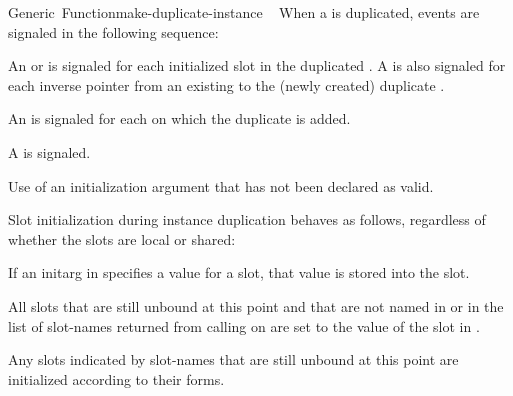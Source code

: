 \documentclass[10pt,twoside,english,pdftex]{article}
\begin{document}
\begin{functiondoc}{Generic~Function}{make-duplicate-instance}{%
     
     
    \mbox{\returns{} }}
\fnevents
{}%
%
%
%
%
%
%
%
%
%
%
%
When a  is duplicated, events are signaled in the
following sequence: 
\begin{tightenumerate}
\item An  or  is
  signaled for each initialized slot in the duplicated
  .  A  is also signaled for
  each inverse pointer from an existing  to the
  (newly created) duplicate .
\item An  is signaled
  for each  on which the duplicate
   is added.
\item A  is signaled.
\end{tightenumerate}

\fnerrors
Use of an initialization argument that has not been declared as valid.

%
%
%
\fndescription 
%
Slot initialization during instance duplication behaves as follows, regardless
of whether the slots are local or shared:
%
\begin{tightitemize}
\item If an initarg in  specifies a value for a slot, that
  value is stored into the slot.
\item All slots that are still unbound at this point and that are not named in
   or in the list of slot-names returned from
  calling \textbf{} on  are
  set to the value of the slot in .
\item Any slots indicated by slot-names that are still unbound at this point
  are initialized according to their  forms. 
\end{tightitemize}


\end{functiondoc}
\end{document}
